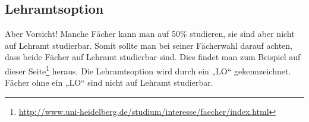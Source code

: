 %
%
%
%
%
%

\subsection{Lehramtsoption}
Aber Vorsicht! Manche Fächer kann man auf 50\% studieren, sie sind aber nicht auf Lehramt studierbar. Somit sollte man bei seiner Fächerwahl darauf achten, dass beide Fächer auf Lehramt studierbar sind. Dies findet man zum Beispiel auf dieser Seite\footnote{\url{http://www.uni-heidelberg.de/studium/interesse/faecher/index.html}} heraus. Die Lehramtsoption wird durch ein „LO“ gekennzeichnet. Fächer ohne ein „LO“ sind nicht auf Lehramt studierbar.

